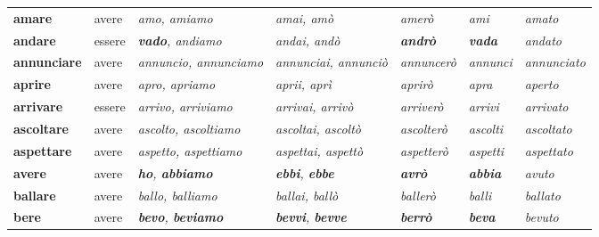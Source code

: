 \documentclass[11pt,a4paper,twoside,openright]{book}
\newcommand{\irr}[1]{{\color{exccol}\bfseries #1}}
\begin{document}
{\begin{xltabular}{\linewidth}{@{}>{\raggedright\arraybackslash}p{2.7cm} l L L l >{\raggedright\arraybackslash}p{1.9cm} l@{}}
\textbf{amare} & avere & \textit{amo, amiamo} & \textit{amai, amò} & \textit{amerò} & \textit{ami} & \textit{amato} \\
\textbf{andare} & essere & \textit{\irr{vado}, andiamo} & \textit{andai, andò} & \textit{\irr{andrò}} & \textit{\irr{vada}} & \textit{andato} \\
\textbf{annunciare} & avere & \textit{annuncio, annunciamo} & \textit{annunciai, annunciò} & \textit{annuncerò} & \textit{annunci} & \textit{annunciato} \\
\textbf{aprire} & avere & \textit{apro, apriamo} & \textit{aprii, aprì} & \textit{aprirò} & \textit{apra} & \textit{aperto} \\
\textbf{arrivare} & essere & \textit{arrivo, arriviamo} & \textit{arrivai, arrivò} & \textit{arriverò} & \textit{arrivi} & \textit{arrivato} \\
\textbf{ascoltare} & avere & \textit{ascolto, ascoltiamo} & \textit{ascoltai, ascoltò} & \textit{ascolterò} & \textit{ascolti} & \textit{ascoltato} \\
\textbf{aspettare} & avere & \textit{aspetto, aspettiamo} & \textit{aspettai, aspettò} & \textit{aspetterò} & \textit{aspetti} & \textit{aspettato} \\
\textbf{avere} & avere & \textit{\irr{ho}, \irr{abbiamo}} & \textit{\irr{ebbi}, \irr{ebbe}} & \textit{\irr{avrò}} & \textit{\irr{abbia}} & \textit{avuto} \\
\textbf{ballare} & avere & \textit{ballo, balliamo} & \textit{ballai, ballò} & \textit{ballerò} & \textit{balli} & \textit{ballato} \\
\textbf{bere} & avere & \textit{\irr{bevo}, \irr{beviamo}} & \textit{\irr{bevvi}, \irr{bevve}} & \textit{\irr{berrò}} & \textit{\irr{beva}} & \textit{bevuto} \\

\end{xltabular}}
\end{document}
